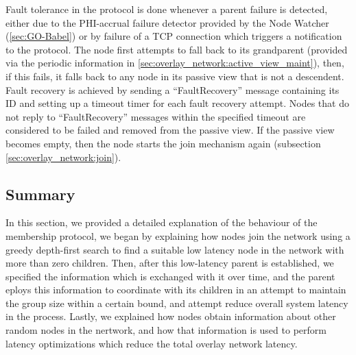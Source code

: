 Fault tolerance in the protocol is done whenever a parent failure is detected, either due to the PHI-accrual failure detector provided by the Node Watcher (\ref{sec:GO-Babel}) or by failure of a TCP connection which triggers a notification to the protocol. The node first attempts to fall back to its grandparent (provided via the periodic information in \ref{sec:overlay_network:active_view_maint}), then, if this fails, it falls back to any node in its passive view that is not a descendent. Fault recovery is achieved by sending a ``FaultRecovery'' message containing its ID and setting up a timeout timer for each fault recovery attempt. Nodes that do not reply to ``FaultRecovery'' messages within the specified timeout are considered to be failed and removed from the passive view. If the passive view becomes empty, then the node starts the join mechanism again (subsection \ref{sec:overlay_network:join}).

\subsection{Summary}

In this section, we provided a detailed explanation of the behaviour of the membership protocol, we began by explaining how nodes join the network using a greedy depth-first search to find a suitable low latency node in the network with more than zero children. Then, after this low-latency parent is established, we specified the information which is exchanged with it over time, and the parent eploys this information to coordinate with its children in an attempt to maintain the group size within a certain bound, and attempt reduce overall system latency in the process. Lastly, we explained how nodes obtain information about other random nodes in the nertwork, and how that information is used to perform latency optimizations which reduce the total overlay network latency.